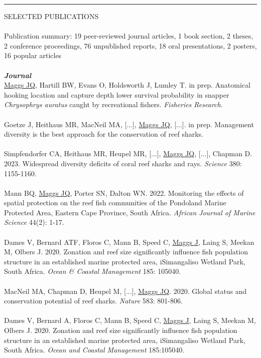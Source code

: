 \documentclass[10pt,a4paper]{article}
\begin{document}
\hrule
\newpage
\vspace{6pt}
\noindent
SELECTED PUBLICATIONS\\
\\
Publication summary: 19 peer-reviewed journal articles, 1 book section, 2 theses, 2 conference proceedings, 76 unpublished reports, 18 oral presentations, 2 posters, 16 popular articles\\ 
\\
\textit{\textbf{Journal}}\\
\noindent
\underline{Maggs JQ}, Hartill BW, Evans O, Holdsworth J, Lumley T. in prep. Anatomical hooking location and capture depth lower survival probability in snapper \textit{Chrysophrys auratus} caught by recreational fishers. \textit{Fisheries Research}.\\ 
\\
Goetze J, Heithaus MR, MacNeil MA, [...], \underline{Maggs JQ}, [...]. in prep. Management diversity is the best approach for the conservation of reef sharks.\\
\\
Simpfendorfer CA, Heithaus MR, Heupel MR, [...], \underline{Maggs JQ}, [...], Chapman D. 2023. Widespread diversity deficits of coral reef sharks and rays. \textit{Science} 380: 1155-1160.\\
\\
Mann BQ, \underline{Maggs JQ}, Porter SN, Dalton WN. 2022. Monitoring the effects of spatial protection on the reef fish communities of the Pondoland Marine Protected Area, Eastern Cape Province, South Africa. \textit{African Journal of Marine Science} 44(2): 1-17.\\
\\
Dames V, Bernard ATF, Floros C, Mann B, Speed C, \underline{Maggs J}, Laing S, Meekan M, Olbers J. 2020. Zonation and reef size significantly influence fish population structure in an established marine protected area, iSimangaliso Wetland Park, South Africa. \textit{Ocean \& Coastal Management} 185: 105040.\\
\\
MacNeil MA, Chapman D, Heupel M, [...], \underline{Maggs JQ}. 2020. Global status and conservation potential of reef sharks. \textit{Nature} 583: 801-806.\\
\\
Dames V, Bernard A, Floros C, Mann B, Speed C, \underline{Maggs J}, Laing S, Meekan M, Olbers J. 2020. Zonation and reef size significantly influence fish population structure in an established marine protected area, iSimangaliso Wetland Park, South Africa. \textit{Ocean and Coastal Management} 185:105040.\\
\end{document}
